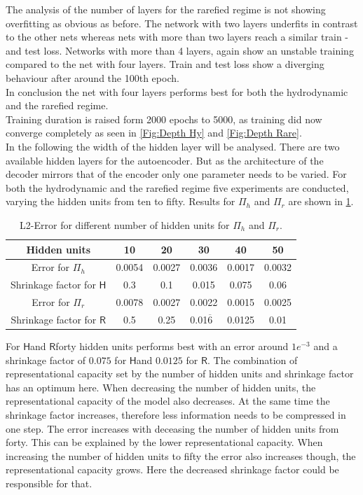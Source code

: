\documentclass[12pt, a4paper]{article}
\newcommand{\hy}{\(\textsf{H}\)}
\newcommand{\rare}{\(\textsf{R}\)}
\begin{document}
The analysis of the number of layers for the rarefied regime is not showing overfitting as obvious as before. The network with two layers underfits in contrast to the other nets whereas nets with more than two layers reach a similar train - and test loss. Networks with more than 4 layers, again show an unstable training compared to the net with four layers. Train and test loss show a diverging behaviour after around the 100th epoch.\\
In conclusion the net with four layers performs best for both the hydrodynamic and the rarefied regime.\\
Training duration is raised form 2000 epochs to 5000, as training did now converge completely as seen in \cref{Fig:Depth Hy} and \cref{Fig:Depth Rare}.\\
In the following the width of the hidden layer will be analysed. There are two available hidden layers for the autoencoder. But as the architecture of the decoder mirrors that of the encoder only one parameter needs to be varied. For both the hydrodynamic and the rarefied regime five experiments are conducted, varying the hidden units from ten to fifty. Results for \(\Pi_h\) and \(\Pi_r\) are shown in \cref{Tab:Hidden Units}.
\begin{table}[!htbp]\centering
	\begin{tabular}{ |c|c|c|c|c|c| }
		\hline
		Hidden units & 10 & 20 & 30  & 40 & 50 \\ [.5ex]
		\hline
		Error for \(\Pi_h\) & 0.0054 & 0.0027 & 0.0036 & 0.0017 & 0.0032\\ \hline
		Shrinkage factor for \hy & 0.3 & 0.1 & 0.015 & 0.075 & 0.06\\ \hline
		Error for \(\Pi_r\)& 0.0078 & 0.0027 & 0.0022 & 0.0015 & 0.0025\\ \hline
		Shrinkage factor for \rare & 0.5 & 0.25 & 0.01$\overline{6}$\ & 0.0125 & 0.01\\ \hline
	\end{tabular}
	\caption{L2-Error for different number of hidden units for \(\Pi_h\) and \(\Pi_r\).}
	\label{Tab:Hidden Units}
\end{table}
For \hy and \rare forty hidden units performs best with an error around \(1e^{-3}\) and a shrinkage factor of \(0.075\) for \hy and \(0.0125\) for \rare. The combination of representational capacity set by the number of hidden units and shrinkage factor has an optimum here.  When decreasing the number of hidden units, the representational capacity of the model also decreases. At the same time the shrinkage factor increases, therefore less information needs to be compressed in one step. The error increases with deceasing the number of hidden units from forty. This can be explained by the lower representational capacity. When increasing the number of hidden units to fifty the error also increases though, the representational capacity grows. Here the decreased shrinkage factor could be responsible for that.\\
\end{document}
